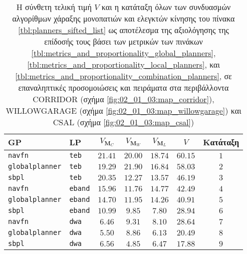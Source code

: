 \begin{table}\centering
\renewcommand{\arraystretch}{1.3}
\begin{tabular}{llccccc}
  GP                      & LP              & $V_{\bm{M}_C}$ & $V_{\bm{M}_W}$ & $V_{\bm{M}_L}$ & $V$      & Κατάταξη \\ \toprule
  \texttt{navfn}          & \texttt{teb}    & $21.41$        & $20.00$        & $18.74$        & $60.15$  & $1$      \\
  \texttt{globalplanner}  & \texttt{teb}    & $19.29$        & $21.90$        & $16.84$        & $58.03$  & $2$      \\
  \texttt{sbpl}           & \texttt{teb}    & $20.35$        & $12.27$        & $13.57$        & $46.19$  & $3$      \\
  \texttt{navfn}          & \texttt{eband}  & $15.96$        & $11.76$        & $14.77$        & $42.49$  & $4$      \\
  \texttt{globalplanner}  & \texttt{eband}  & $14.70$        & $11.95$        & $14.26$        & $40.91$  & $5$      \\
  \texttt{sbpl}           & \texttt{eband}  & $10.99$        & $9.85$         & $7.80$         & $28.94$  & $6$      \\
  \texttt{navfn}          & \texttt{dwa}    & $6.46$         & $9.31$         & $8.10$         & $28.64$  & $7$      \\
  \texttt{globalplanner}  & \texttt{dwa}    & $5.50$         & $8.86$         & $6.13$         & $20.49$  & $8$      \\
  \texttt{sbpl}           & \texttt{dwa}    & $6.56$         & $4.85$         & $6.47$         & $17.88$  & $9$      \\ \bottomrule
\end{tabular}
\caption{\small Η σύνθετη τελική τιμή $V$ και η κατάταξη όλων των συνδυασμών
         αλγορίθμων χάραξης μονοπατιών και ελεγκτών κίνησης του πίνακα
         \ref{tbl:planners_sifted_list} ως αποτέλεσμα της αξιολόγησης της
         επίδοσής τους βάσει των μετρικών των πινάκων
         \ref{tbl:metrics_and_proportionality_global_planners},
         \ref{tbl:metrics_and_proportionality_local_planners}, και
         \ref{tbl:metrics_and_proportionality_combination_planners}, σε
         επαναληπτικές προσομοιώσεις και πειράματα στα περιβάλλοντα CORRIDOR
         (σχήμα \ref{fig:02_01_03:map_corridor}), WILLOWGARAGE (σχήμα
         \ref{fig:02_01_03:map_willowgarage}) και CSAL (σχήμα
         \ref{fig:02_01_03:map_csal})}
\label{tbl:rank_overall}
\end{table}

